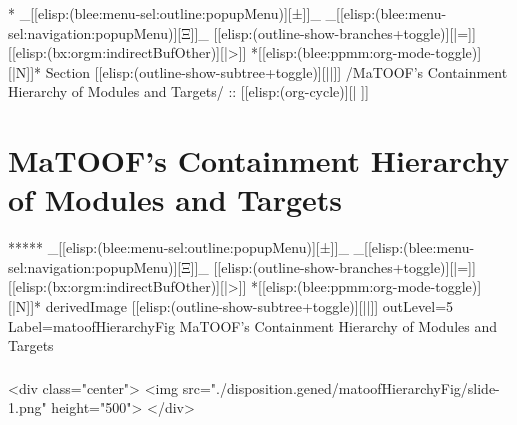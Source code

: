 
\begin{whenOrg}
*  _[[elisp:(blee:menu-sel:outline:popupMenu)][±]]_ _[[elisp:(blee:menu-sel:navigation:popupMenu)][Ξ]]_ [[elisp:(outline-show-branches+toggle)][|=]] [[elisp:(bx:orgm:indirectBufOther)][|>]] *[[elisp:(blee:ppmm:org-mode-toggle)][|N]]*  Section    [[elisp:(outline-show-subtree+toggle)][||]]   /MaTOOF's Containment Hierarchy of Modules and Targets/ ::  [[elisp:(org-cycle)][| ]]
\end{whenOrg}

\section{MaTOOF's Containment Hierarchy of Modules and Targets}


\begin{whenOrg}
*****  _[[elisp:(blee:menu-sel:outline:popupMenu)][±]]_ _[[elisp:(blee:menu-sel:navigation:popupMenu)][Ξ]]_ [[elisp:(outline-show-branches+toggle)][|=]] [[elisp:(bx:orgm:indirectBufOther)][|>]] *[[elisp:(blee:ppmm:org-mode-toggle)][|N]]*  derivedImage [[elisp:(outline-show-subtree+toggle)][||]] outLevel=5 Label=matoofHierarchyFig MaTOOF's Containment Hierarchy of Modules and Targets
\end{whenOrg}

\begin{htmlonly}

\begin{frame}[fragile,plain,label=matoofHierarchyFig]
    \frametitle{}
    \framesubtitle{}
    \begin{rawhtml}
<div class="center">
<img src="./disposition.gened/matoofHierarchyFig/slide-1.png" height="500">
</div>
    \end{rawhtml}
\end{frame}
\end{htmlonly}

